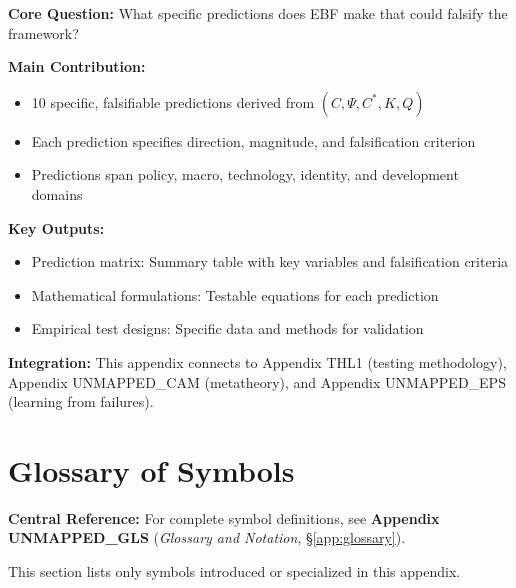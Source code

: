 \begin{tcolorbox}[colback=green!10!white, colframe=green!75!black,
    title=\textbf{Appendix UNMAPPED_SUN: Summary}]

\textbf{Core Question:} What specific predictions does EBF make that could falsify the framework?

\textbf{Main Contribution:}
\begin{itemize}[nosep]
    \item 10 specific, falsifiable predictions derived from $(C, \Psi, C^*, K, Q)$
    \item Each prediction specifies direction, magnitude, and falsification criterion
    \item Predictions span policy, macro, technology, identity, and development domains
\end{itemize}

\textbf{Key Outputs:}
\begin{itemize}[nosep]
    \item Prediction matrix: Summary table with key variables and falsification criteria
    \item Mathematical formulations: Testable equations for each prediction
    \item Empirical test designs: Specific data and methods for validation
\end{itemize}

\textbf{Integration:} This appendix connects to Appendix THL1 (testing methodology), Appendix UNMAPPED_CAM (metatheory), and Appendix UNMAPPED_EPS (learning from failures).

\end{tcolorbox}


\section{Glossary of Symbols}
\label{sec:S-glossary}

\begin{tcolorbox}[colback=blue!5!white, colframe=blue!75!black]
\textbf{Central Reference:} For complete symbol definitions, see
\textbf{Appendix UNMAPPED_GLS} (\textit{Glossary and Notation}, \S\ref{app:glossary}).

This section lists only symbols introduced or specialized in this appendix.
\end{tcolorbox}

